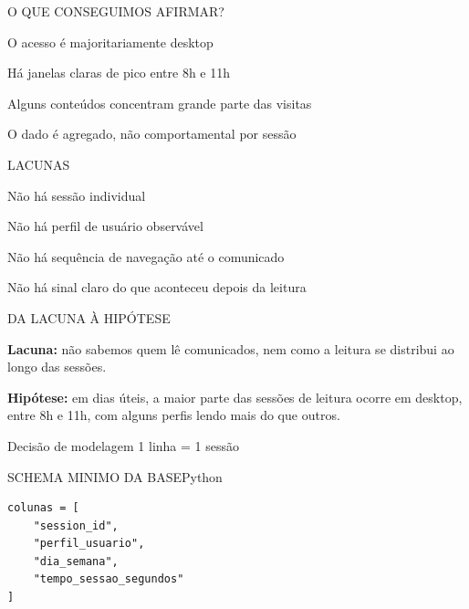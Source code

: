 \documentclass[aspectratio=169]{beamer}
\begin{document}
\bulletslide
  {O QUE CONSEGUIMOS AFIRMAR?}
  {}
  {
    \item O acesso é majoritariamente desktop
    \item Há janelas claras de pico entre 8h e 11h
    \item Alguns conteúdos concentram grande parte das visitas
    \item O dado é agregado, não comportamental por sessão
  }


\bulletslide
  {LACUNAS}
  {}
  {
    \item Não há sessão individual
    \item Não há perfil de usuário observável
    \item Não há sequência de navegação até o comunicado
    \item Não há sinal claro do que aconteceu depois da leitura
  }


\textslide
  {DA LACUNA À HIPÓTESE}
  {}
  {
    \textbf{Lacuna:} não sabemos quem lê comunicados, nem como a leitura
    se distribui ao longo das sessões.

    \vspace{0.8em}
    \textbf{Hipótese:} em dias úteis, a maior parte das sessões de
    leitura ocorre em desktop, entre 8h e 11h, com alguns perfis lendo mais
    do que outros.
  }

\stmtslide
  {Decisão de modelagem}
  {1 linha = 1 sessão}



\begin{singlecodeslide}{SCHEMA MINIMO DA BASE}{Python}
\begin{lstlisting}
colunas = [
    "session_id",
    "perfil_usuario",
    "dia_semana",
    "tempo_sessao_segundos"
]
\end{lstlisting}
\end{singlecodeslide}

\end{document}
